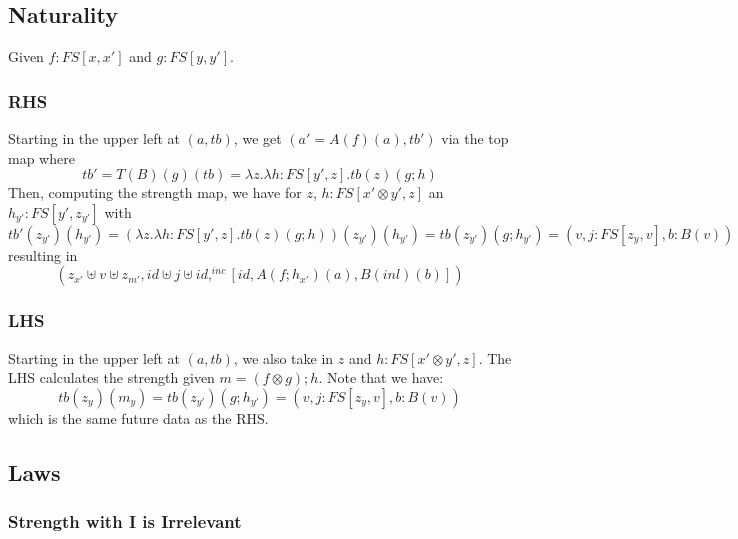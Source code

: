 \documentclass{article}
\begin{document}
\subsection{Naturality}
Given $f : FS[x , x']$ and $g: FS[y , y']$.
\begin{figure}[!ht]
    \centering
{}
\end{figure}

\subsubsection{RHS}
Starting in the upper left at $(a,tb)$, we get $(a' = A(f)(a),tb')$ via the top map where 
\[
    tb' = T(B)(g)(tb) = \lambda z. \lambda h: FS[y' , z]. tb(z)(g ; h)
\]
Then, computing the strength map, we have for $z$, $h : FS[ x' \otimes y' , z]$ an $h_{y'} : FS [ y' , z_{y'}]$ with
\[
    tb'(z_{y'})(h_{y'}) = (\lambda z. \lambda h: FS[y' , z]. tb(z)(g ; h)) (z_{y'})(h_{y'}) = tb(z_{y'})(g ; h_{y'}) = (v , j : FS[z_y , v], b : B(v))
\]
resulting in 
\[
  (z_{x'} \uplus v \uplus z_{m'}, id \uplus j \uplus id , ^{inc}[id, A(f ; h_{x'})(a), B(inl)(b)] )
\]
\subsubsection{LHS}
Starting in the upper left at $(a,tb)$, we also take in $z$ and $h : FS [x' \otimes y' , z]$. 
The LHS calculates the strength given $m = (f \otimes g) ; h$. Note that we have:
\[
    tb(z_y)(m_y) = tb(z_{y'})(g ; h_{y'}) = (v , j : FS[z_y , v], b : B(v))
\]
which is the same future data as the RHS.

\subsection{Laws}
\subsubsection{Strength with I is Irrelevant}
\end{document}
